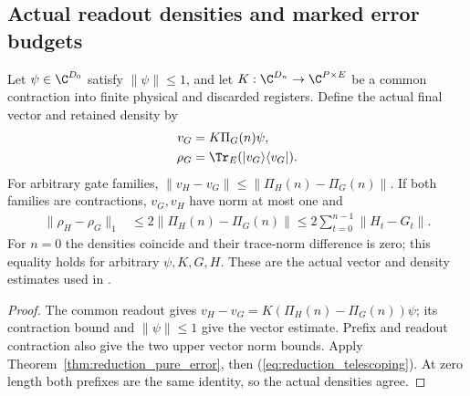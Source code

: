 \subsection{Actual readout densities and marked error budgets}

\begin{theorem}
    \label{thm:reduction_readout}
    \leanok
    Let $\psi\in\C^{D_0}$ satisfy $\lVert\psi\rVert\leq1$, and let
    $K:\C^{D_n}\to\C^{P\times E}$ be a common contraction into finite
    physical and discarded registers. Define the actual final vector and
    retained density by
    \begin{align}
        v_G    & =K\Pi_G(n)\psi,
        \label{eq:reduction_readout_vector}       \\
        \rho_G & =\Tr_E(|v_G\rangle\langle v_G|).
        \label{eq:reduction_readout_density}
    \end{align}
    For arbitrary gate families,
    $\lVert v_H-v_G\rVert\leq\lVert\Pi_H(n)-\Pi_G(n)\rVert$.
    If both families are contractions, $v_G,v_H$ have norm at most one and
    \begin{align}
        \lVert\rho_H-\rho_G\rVert_1
         & \leq2\lVert\Pi_H(n)-\Pi_G(n)\rVert
        \leq2\sum_{t=0}^{n-1}\lVert H_t-G_t\rVert.
        \label{eq:reduction_readout_error}
    \end{align}
    For $n=0$ the densities coincide and their trace-norm difference is
    zero; this equality holds for arbitrary $\psi,K,G,H$.
    These are the actual vector and density estimates used in
    \cite[Equation~(5.3)]{OpenAI2026PolynomialPEPS}.
\end{theorem}

\begin{proof}\leanok
    The common readout gives
    $v_H-v_G=K(\Pi_H(n)-\Pi_G(n))\psi$; its contraction bound and
    $\lVert\psi\rVert\leq1$ give the vector estimate. Prefix and readout
    contraction also give the two upper vector norm bounds. Apply
    Theorem~\ref{thm:reduction_pure_error}, then
    (\ref{eq:reduction_telescoping}). At zero length both prefixes are
    the same identity, so the actual densities agree.
\end{proof}

